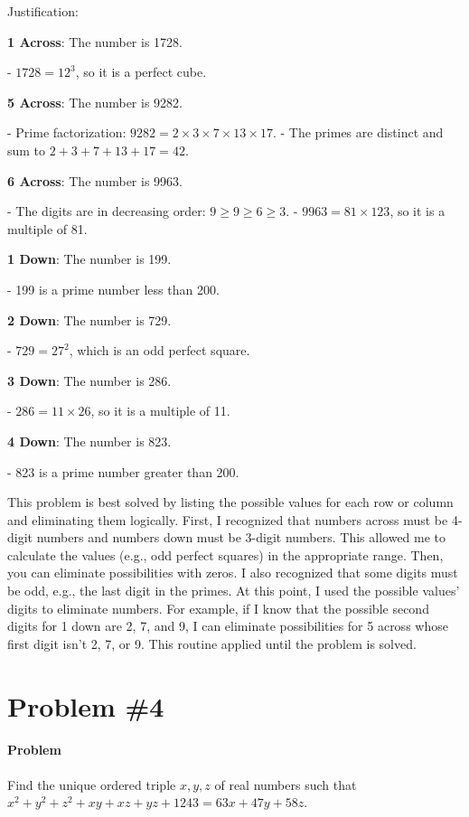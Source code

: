 \documentclass[10pt]{article}
\theoremstyle{plain}
\theoremstyle{definition}
\theoremstyle{remark}
\begin{document}
Justification:

\textbf{1 Across}: The number is 1728.

- \(1728 = 12^3\), so it is a perfect cube.

\textbf{5 Across}: The number is 9282.

- Prime factorization: \(9282 = 2 \times 3 \times 7 \times 13 \times 17\).
- The primes are distinct and sum to \(2 + 3 + 7 + 13 + 17 = 42\).

\textbf{6 Across}: The number is 9963.

- The digits are in decreasing order: \(9 \geq 9 \geq 6 \geq 3\).
- \(9963 = 81 \times 123\), so it is a multiple of 81.


\textbf{1 Down}: The number is 199.

- 199 is a prime number less than 200.

\textbf{2 Down}: The number is 729.

- \(729 = 27^2\), which is an odd perfect square.

\textbf{3 Down}: The number is 286.

- \(286 = 11 \times 26\), so it is a multiple of 11.

\textbf{4 Down}: The number is 823.

- 823 is a prime number greater than 200.

This problem is best solved by listing the possible values for each row or column and eliminating them logically. First, I recognized that numbers across must be 4-digit numbers and numbers down must be 3-digit numbers. This allowed me to calculate the values (e.g., odd perfect squares) in the appropriate range. Then, you can eliminate possibilities with zeros. I also recognized that some digits must be odd, e.g., the last digit in the primes. At this point, I used the possible values' digits to eliminate numbers. For example, if I know that the possible second digits for 1 down are 2, 7, and 9, I can eliminate possibilities for 5 across whose first digit isn't 2, 7, or 9. This routine applied until the problem is solved. 

\section{Problem \#4}

\paragraph{Problem} Find the unique ordered triple \(x,y,z\) of real numbers such that \(x^2+y^2+z^2+xy+xz+yz+1243=63x+47y+58z\).
\end{document}
